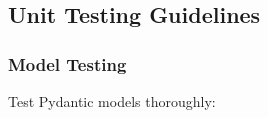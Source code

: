 \documentclass[letterpaper,10pt,english]{sphinxmanual}
\begin{document}
\subsection{Unit Testing Guidelines}
\label{\detokenize{developer/testing:unit-testing-guidelines}}

\subsubsection{Model Testing}
\label{\detokenize{developer/testing:model-testing}}
\sphinxAtStartPar
Test Pydantic models thoroughly:

\begin{sphinxVerbatim}[commandchars=\\\{\}]


\end{sphinxVerbatim}
\end{document}
